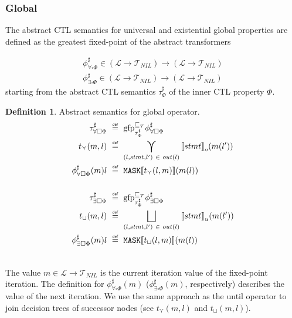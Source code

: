 \documentclass[11pt,a4paper,titlepage]{article}
\theoremstyle{definition}
\newtheorem{definition}{Definition}[section]
\newcommand\eqdef{\mathrel{\overset{\makebox[0pt]{\mbox{\normalfont\tiny\sffamily def}}}{=}}}
\begin{document}
\subsubsection*{Global}
The abstract CTL semantics for universal and existential \textsf{global} properties are defined as the greatest fixed-point of the abstract transformers

\begin{align*}
    \phi^\sharp_{\forall\square\Phi} \in (\mathcal{L} \rightarrow \mathcal{T}_{NIL}) \rightarrow (\mathcal{L} \rightarrow \mathcal{T}_{NIL})\\
    \phi^\sharp_{\exists\square\Phi} \in (\mathcal{L} \rightarrow \mathcal{T}_{NIL}) \rightarrow (\mathcal{L} \rightarrow \mathcal{T}_{NIL})
\end{align*}
starting from the abstract CTL semantics $\tau^\sharp_\Phi$ of the inner CTL property $\Phi$.

\begin{definition}\label{def:abstract_global_semantics}
    Abstract semantics for \textsf{global} operator.
    \setlength{\jot}{15pt}
    \begin{align*}
        \tau^\sharp_{\forall\square\Phi} \ &\eqdef \ \text{gfp}^{\sqsubseteq_{\mathcal{T}}}_{\tau^\sharp_\Phi} \phi^\sharp_{\forall\square\Phi}\\
        t_{\curlyvee}(m, l)  \ &\eqdef \ \bigcurlyvee\limits_{(l, stmt, l') \ \in \ out(l) } {\llbracket stmt \rrbracket}_{o} ( m(l')) \\
        \phi^\sharp_{\forall\square\Phi}(m)l \ &\eqdef \ \mathtt{MASK}\llbracket t_{\curlyvee}(l,m)\rrbracket (m(l))  \\\\
        \tau^\sharp_{\exists\square\Phi} \ &\eqdef \ \text{gfp}^{\sqsubseteq_{\mathcal{T}}}_{\tau^\sharp_\Phi} \phi^\sharp_{\exists\square\Phi}\\
        t_{\sqcup}(m, l)  \ &\eqdef \ \bigsqcup\limits_{(l, stmt, l') \ \in \ out(l) } {\llbracket stmt \rrbracket}_{u} ( m(l')) \\
        \phi^\sharp_{\exists\square\Phi}(m)l \ &\eqdef \ \mathtt{MASK}\llbracket t_{\sqcup}(l,m) \rrbracket (m(l))  \\\\
    \end{align*}
\end{definition}

The value $m \in \mathcal{L} \rightarrow \mathcal{T}_{NIL}$ is the current iteration value of the fixed-point iteration. 
The definition for $\phi^\sharp_{\forall\square\Phi}(m)$ ($\phi^\sharp_{\exists\square\Phi}(m)$, respectively) describes the value of the next iteration.
We use the same approach as the \textsf{until} operator to join decision trees of successor nodes
(see $t_{\curlyvee}(m, l)$ and $t_{\sqcup}(m, l)$).\\
\end{document}
